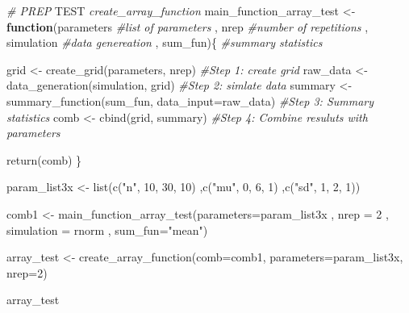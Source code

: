 \documentclass[11pt,a4paper]{article}
\newenvironment{Shaded}{\begin{snugshade}}{\end{snugshade}}
\newcommand{\AlertTok}[1]{\textcolor[rgb]{0.94,0.16,0.16}{#1}}
\newcommand{\AttributeTok}[1]{\textcolor[rgb]{0.77,0.63,0.00}{#1}}
\newcommand{\CommentTok}[1]{\textcolor[rgb]{0.56,0.35,0.01}{\textit{#1}}}
\newcommand{\ControlFlowTok}[1]{\textcolor[rgb]{0.13,0.29,0.53}{\textbf{#1}}}
\newcommand{\DecValTok}[1]{\textcolor[rgb]{0.00,0.00,0.81}{#1}}
\newcommand{\FunctionTok}[1]{\textcolor[rgb]{0.00,0.00,0.00}{#1}}
\newcommand{\NormalTok}[1]{#1}
\newcommand{\OtherTok}[1]{\textcolor[rgb]{0.56,0.35,0.01}{#1}}
\newcommand{\StringTok}[1]{\textcolor[rgb]{0.31,0.60,0.02}{#1}}
\begin{document}
\begin{Shaded}
\begin{Highlighting}[]
\CommentTok{\# PREP }\AlertTok{TEST}\CommentTok{ \textasciigrave{}create\_array\_function\textasciigrave{}}
\NormalTok{main\_function\_array\_test }\OtherTok{\textless{}{-}}  \ControlFlowTok{function}\NormalTok{(parameters }\CommentTok{\#list of parameters}
\NormalTok{                                      , nrep }\CommentTok{\#number of repetitions}
\NormalTok{                                      , simulation }\CommentTok{\#data genereation}
\NormalTok{                                      , sum\_fun)\{ }\CommentTok{\#summary statistics}
  
\NormalTok{  grid }\OtherTok{\textless{}{-}} \FunctionTok{create\_grid}\NormalTok{(parameters, nrep) }\CommentTok{\#Step 1: create grid}
\NormalTok{  raw\_data }\OtherTok{\textless{}{-}} \FunctionTok{data\_generation}\NormalTok{(simulation, grid) }\CommentTok{\#Step 2: simlate data}
\NormalTok{  summary }\OtherTok{\textless{}{-}} \FunctionTok{summary\_function}\NormalTok{(sum\_fun, }\AttributeTok{data\_input=}\NormalTok{raw\_data) }\CommentTok{\#Step 3: Summary statistics}
\NormalTok{  comb }\OtherTok{\textless{}{-}} \FunctionTok{cbind}\NormalTok{(grid, summary) }\CommentTok{\#Step 4: Combine resuluts with parameters}
 
  \FunctionTok{return}\NormalTok{(comb)}
\NormalTok{\}}





\NormalTok{param\_list3x }\OtherTok{\textless{}{-}} \FunctionTok{list}\NormalTok{(}\FunctionTok{c}\NormalTok{(}\StringTok{"n"}\NormalTok{, }\DecValTok{10}\NormalTok{, }\DecValTok{30}\NormalTok{, }\DecValTok{10}\NormalTok{)}
\NormalTok{                     ,}\FunctionTok{c}\NormalTok{(}\StringTok{"mu"}\NormalTok{, }\DecValTok{0}\NormalTok{, }\DecValTok{6}\NormalTok{, }\DecValTok{1}\NormalTok{)}
\NormalTok{                     ,}\FunctionTok{c}\NormalTok{(}\StringTok{"sd"}\NormalTok{, }\DecValTok{1}\NormalTok{, }\DecValTok{2}\NormalTok{, }\DecValTok{1}\NormalTok{))}

\NormalTok{comb1 }\OtherTok{\textless{}{-}} \FunctionTok{main\_function\_array\_test}\NormalTok{(}\AttributeTok{parameters=}\NormalTok{param\_list3x}
\NormalTok{                                  , }\AttributeTok{nrep =} \DecValTok{2}
\NormalTok{                                  , }\AttributeTok{simulation =}\NormalTok{ rnorm}
\NormalTok{                                  , }\AttributeTok{sum\_fun=}\StringTok{"mean"}\NormalTok{)}

\NormalTok{array\_test }\OtherTok{\textless{}{-}} \FunctionTok{create\_array\_function}\NormalTok{(}\AttributeTok{comb=}\NormalTok{comb1,}
                                    \AttributeTok{parameters=}\NormalTok{param\_list3x, }\AttributeTok{nrep=}\DecValTok{2}\NormalTok{)}

\NormalTok{array\_test}
\end{Highlighting}
\end{Shaded}
\end{document}
